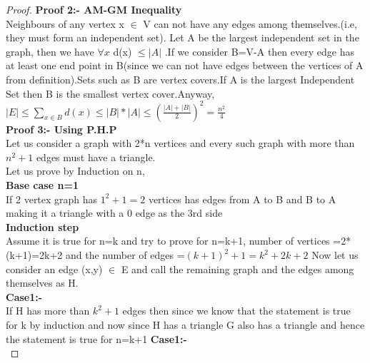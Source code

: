 \begin{proof}

\newpage
\textbf{Proof 2:- AM-GM Inequality}\\
Neighbours of any vertex x $\in$ V can not have any edges among themselves.(i.e, they must form an independent set). Let A be the largest independent set in the graph, then we have $\forall x$
d(x) $\leq |A|$ .If we consider B=V-A then every edge has at least one end point in B(since we can not have edges between the vertices of A from definition).Sets such as B are vertex covers.If A is the largest Independent Set then B is the smallest vertex cover.Anyway, $|E| \leq \sum_{x \in B} d(x) \leq |B|*|A|\leq (\frac{|A|+|B|}{2})^2=\frac{n^2}{4}$\\
\textbf{Proof 3:- Using P.H.P}\\
Let us consider a graph with 2*n vertices and every such graph with more than $n^2+1$ edges must have a triangle.\\
Let us prove by Induction on n,\\
\textbf{Base case n=1}\\
If 2 vertex graph has $1^2+1=2$ vertices has edges from A to B and B to A making it a triangle with a 0 edge as the 3rd side\\
\textbf{Induction step}\\
Assume it is true for n=k and try to prove for n=k+1,
number of vertices =2*(k+1)=2k+2 and the number of edges =$(k+1)^2+1=k^2+2k+2$
Now let us consider an edge (x,y) $\in$ E and call the remaining graph and the edges among themselves as H.\\
\textbf{Case1:-}\\
If H has more than $k^2+1$ edges then since we know that the statement is true for k by induction and now since H has a triangle G also has a triangle and hence the statement is true for n=k+1
\textbf{Case1:-}\\

\end{proof}

